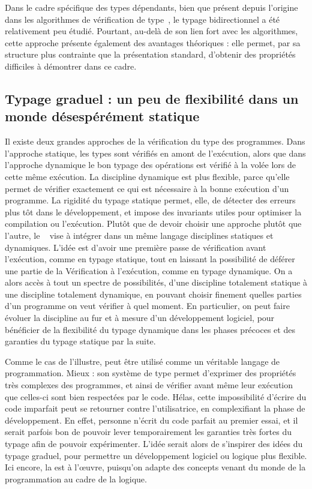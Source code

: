 Dans le cadre spécifique des types dépendants, bien que présent depuis l’origine dans les algorithmes de vérification de type~,
le typage bidirectionnel a été relativement peu étudié.
Pourtant, au-delà de son lien fort avec les algorithmes,
cette approche présente également des avantages théoriques : elle permet,
par sa structure plus contrainte que la présentation standard,
d’obtenir des propriétés difficiles à démontrer dans ce cadre.

\subsection[Typage graduel]
  {Typage graduel : un peu de flexibilité dans un monde désespérément statique}
\label{sec:intro-graduel}

Il existe deux grandes approches de la vérification du type des programmes.
Dans l’approche statique,
les types sont vérifiés en amont de l’exécution, alors que dans l’approche dynamique le bon typage des opérations est vérifié à la volée lors de cette même exécution.
La discipline dynamique est plus flexible, parce qu’elle permet de vérifier exactement ce qui est nécessaire à la bonne exécution d’un programme.
La rigidité du typage statique permet, elle, de détecter des erreurs plus tôt dans le développement, et impose des invariants utiles pour optimiser la compilation ou l’exécution.
Plutôt que de devoir choisir une approche plutôt que l’autre,
le ~ vise à intégrer
dans un même langage disciplines statiques et dynamiques.
L’idée est d’avoir une première passe de vérification avant l’exécution, comme en typage statique, tout en laissant la possibilité de déférer une partie de la Vérification à l’exécution, comme en typage dynamique.
On a alors accès à tout un spectre de possibilités,
d’une discipline totalement statique à une discipline totalement dynamique,
en pouvant choisir finement quelles parties d’un programme on veut vérifier à quel moment.
En particulier, on peut faire évoluer la discipline au fur et à mesure d’un développement
logiciel, pour bénéficier de la flexibilité du typage dynamique dans les phases précoces et des
garanties du typage statique par la suite.

Comme le cas de  l’illustre,  peut être utilisé comme un véritable langage
de programmation. Mieux : son système de type 
permet d’exprimer des propriétés très complexes des programmes, et ainsi de vérifier
avant même leur exécution que celles-ci sont bien respectées par le code.
Hélas, cette impossibilité d’écrire du code imparfait peut
se retourner contre l’utilisatrice, en complexifiant la phase de développement.
En effet, personne n’écrit du code parfait au premier essai, et il serait parfois bon de
pouvoir lever temporairement les garanties très fortes du typage afin de pouvoir
expérimenter.
L’idée serait alors de s’inspirer des idées du typage graduel, pour permettre un développement
logiciel ou logique plus flexible. Ici encore, la 
est à l’œuvre, puisqu’on adapte des concepts venant du monde de la programmation
au cadre de la logique.

